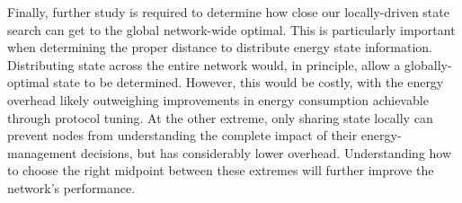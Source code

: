 Finally, further study is required to determine how close our locally-driven
state search can get to the global network-wide optimal. This is particularly
important when determining the proper distance to distribute energy state
information. Distributing state across the entire network would, in
principle, allow a globally-optimal state to be determined. However, this
would be costly, with the energy overhead likely outweighing improvements in
energy consumption achievable through protocol tuning. At the other extreme,
only sharing state locally can prevent nodes from understanding the complete
impact of their energy-management decisions, but has considerably lower
overhead. Understanding how to choose the right midpoint between these
extremes will further improve the network's performance.
